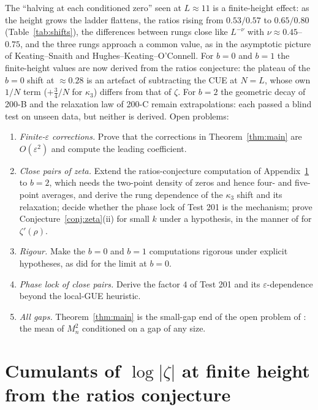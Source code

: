 \documentclass[12pt]{amsart}
\theoremstyle{remark}
\newcommand{\eps}{\varepsilon}
\newcommand{\1}{\mathbf{1}}
\begin{document}
The ``halving at each conditioned zero'' seen at $L\approx11$ is a
finite-height effect: as the height grows the ladder flattens, the ratios
rising from $0.53/0.57$ to $0.65/0.80$ (Table~\ref{tab:shifts}), the
differences between rungs close like $L^{-\nu}$ with $\nu\approx0.45$--$0.75$,
and the three rungs approach a common value, as in the asymptotic picture of
Keating--Snaith and Hughes--Keating--O'Connell. For $b=0$ and $b=1$ the
finite-height values are now derived from the ratios conjecture: the plateau of the $b=0$ shift at
$\approx0.28$ is an artefact of subtracting the CUE at $N=L$, whose own
$1/N$ term ($+\frac34/N$ for $\kappa_3$) differs from that of $\zeta$. For
$b=2$ the geometric decay of 200-B and the relaxation law of 200-C remain
extrapolations: each passed a blind test on unseen data, but neither is
derived. Open problems:
\begin{enumerate}
\item \emph{Finite-$\eps$ corrections.} Prove that the corrections in
Theorem~\ref{thm:main} are $O(\eps^2)$ and compute the leading
coefficient.
\item \emph{Close pairs of zeta.} Extend the ratios-conjecture computation
of Appendix~\ref{app:ratios} to $b=2$, which needs the two-point density
of zeros and hence four- and five-point averages, and derive the rung
dependence of the $\kappa_3$ shift and its relaxation; decide whether the
phase lock of Test 201 is the mechanism; prove
Conjecture~\ref{conj:zeta}(ii) for small $k$ under a hypothesis, in the
manner of \cite{BGM15} for $\zeta'(\rho)$.
\item \emph{Rigour.} Make the $b=0$ and $b=1$ computations rigorous under
explicit hypotheses, as \cite{FG24} did for the limit at $b=0$.
\item \emph{Phase lock of close pairs.} Derive the factor $4$ of Test 201
and its $\eps$-dependence beyond the local-GUE heuristic.
\item \emph{All gaps.} Theorem~\ref{thm:main} is the small-gap end of the
open problem of \cite{companion1}: the mean of $M_n^2$ conditioned on a
gap of any size.
\end{enumerate}

\appendix
\section{Cumulants of $\log|\zeta|$ at finite height from the ratios
conjecture}\label{app:ratios}
\end{document}
